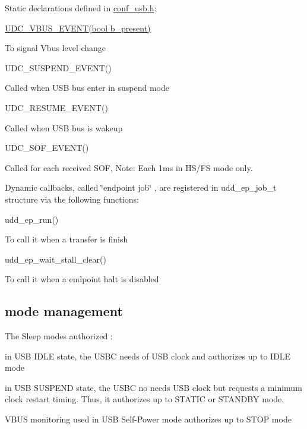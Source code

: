 \-Static declarations defined in \hyperlink{conf__usb_8h}{conf\-\_\-usb.\-h}\-:
\begin{DoxyItemize}
\item \hyperlink{conf__usb_8h_a009dfd7822890bfe9a8975f14d952508}{\-U\-D\-C\-\_\-\-V\-B\-U\-S\-\_\-\-E\-V\-E\-N\-T(bool b\-\_\-present)}\par
 \-To signal \-Vbus level change
\item \-U\-D\-C\-\_\-\-S\-U\-S\-P\-E\-N\-D\-\_\-\-E\-V\-E\-N\-T()\par
 \-Called when \-U\-S\-B bus enter in suspend mode
\item \-U\-D\-C\-\_\-\-R\-E\-S\-U\-M\-E\-\_\-\-E\-V\-E\-N\-T()\par
 \-Called when \-U\-S\-B bus is wakeup
\item \-U\-D\-C\-\_\-\-S\-O\-F\-\_\-\-E\-V\-E\-N\-T()\par
 \-Called for each received \-S\-O\-F, \-Note\-: \-Each 1ms in \-H\-S/\-F\-S mode only.
\end{DoxyItemize}

\-Dynamic callbacks, called \char`\"{}endpoint job\char`\"{} , are registered in udd\-\_\-ep\-\_\-job\-\_\-t structure via the following functions\-:
\begin{DoxyItemize}
\item udd\-\_\-ep\-\_\-run()\par
 \-To call it when a transfer is finish
\item udd\-\_\-ep\-\_\-wait\-\_\-stall\-\_\-clear()\par
 \-To call it when a endpoint halt is disabled
\end{DoxyItemize}\hypertarget{group__udd__group_Power}{}\subsection{mode management}\label{group__udd__group_Power}
\-The \-Sleep modes authorized \-:
\begin{DoxyItemize}
\item in \-U\-S\-B \-I\-D\-L\-E state, the \-U\-S\-B\-C needs of \-U\-S\-B clock and authorizes up to \-I\-D\-L\-E mode
\item in \-U\-S\-B \-S\-U\-S\-P\-E\-N\-D state, the \-U\-S\-B\-C no needs \-U\-S\-B clock but requests a minimum clock restart timing. \-Thus, it authorizes up to \-S\-T\-A\-T\-I\-C or \-S\-T\-A\-N\-D\-B\-Y mode.
\item \-V\-B\-U\-S monitoring used in \-U\-S\-B \-Self-\/\-Power mode authorizes up to \-S\-T\-O\-P mode
\end{DoxyItemize}

